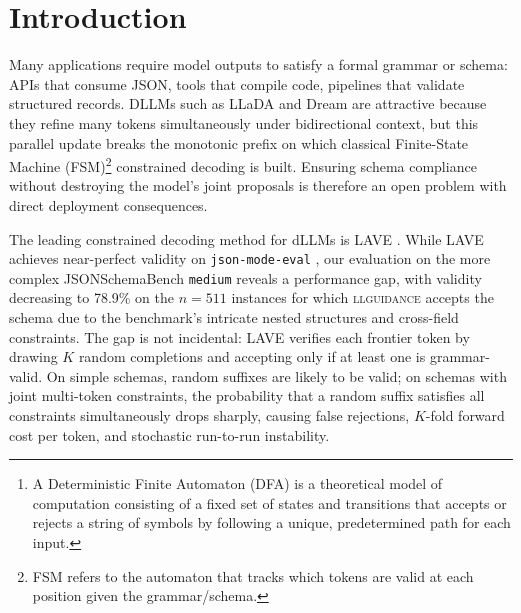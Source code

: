\begin{abstract}
The leading constrained decoding method for discrete diffusion language models (dLLMs) reports about $99\%$ validity on simple JSON benchmarks, but this does not transfer to harder schemas. On JSONSchemaBench \texttt{medium} dataset, stochastic lookahead-verify achieves only 78.9\% validity, consuming 255.3 lookahead draws per instance and timing out on 61 instances. We address this in two steps. \textbf{Dgrammar} replaces stochastic lookahead with deterministic frontier masking, AIMD batching, and async mask overlap, raising validity to 84.9\% and eliminating all timeouts. \textbf{DPGrammar} adds a Viterbi Dynamic Programming (DP) that jointly repairs violated token spans over grammar DFA\footnote{A Deterministic Finite Automaton (DFA) is a theoretical model of computation consisting of a fixed set of states and transitions that accepts or rejects a string of symbols by following a unique, predetermined path for each input.} states, reaching \textbf{95.3\%} validity with 2.11 mean resamples. Code: \url{https://github.com/buffett0323/anlp_final}.
\end{abstract}

\section{Introduction}

Many applications require model outputs to satisfy a formal grammar or schema: APIs that consume JSON, tools that compile code, pipelines that validate structured records. DLLMs such as LLaDA \citep{llada} and Dream \citep{dream} are attractive because they refine many tokens simultaneously under bidirectional context, but this parallel update breaks the monotonic prefix on which classical 
Finite-State Machine (FSM)\footnote{FSM refers to the automaton that tracks which tokens are valid at each position given the grammar/schema.} constrained decoding is built. Ensuring schema compliance without destroying the model's joint proposals is therefore an open problem with direct deployment consequences.

The leading constrained decoding method for dLLMs is LAVE \citep{zhang2026lookaheadthenverifyreliableconstraineddecoding}. While LAVE achieves near-perfect validity on \texttt{json-mode-eval} \citep{nousresearch2024jsonmodeeval}, our evaluation on the more complex JSONSchemaBench \citep{geng2025jsonschemabenchrigorousbenchmarkstructured} \texttt{medium} reveals a performance gap, with validity decreasing to 78.9\% on the $n{=}511$ instances for which \textsc{llguidance} \citep{microsoft2025llguidance} accepts the schema due to the benchmark's intricate nested structures and cross-field constraints. The gap is not incidental: LAVE verifies each frontier token by drawing $K$ random completions and accepting only if at least one is grammar-valid. On simple schemas, random suffixes are likely to be valid; on schemas with joint multi-token constraints, the probability that a random suffix satisfies all constraints simultaneously drops sharply, causing false rejections, $K$-fold forward cost per token, and stochastic run-to-run instability.

